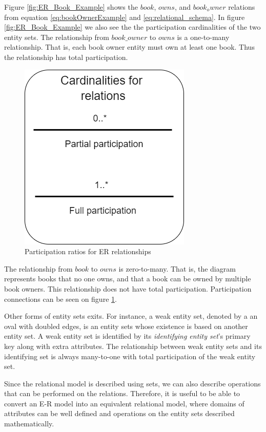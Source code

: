 Figure \ref{fig:ER_Book_Example} shows the $book$, $owns$, and $book_owner$ relations from equation \ref{eq:bookOwnerExample} and \ref{eq:relational_schema}.
In figure \ref{fig:ER_Book_Example} we also see the  the participation cardinalities of the two entity sets. 
The relationship from $book\_owner$ to $owns$ is a one-to-many relationship. That is, each book owner entity must own at least one book. Thus the relationship has total participation. 
\begin{figure}[h]
    \centering
    \includegraphics[scale=0.5]{Images/cardinalities.png}
    \caption{Participation ratios for ER relationships}
    \label{fig:ERDiagram_Cardinality}
\end{figure}
The relationship from $book$ to $owns$ is zero-to-many. That is, the diagram represents books that no one owns, and that a book can be owned by multiple book owners.
This relationship does not have total participation. Participation connections can be seen on figure \ref{fig:ERDiagram_Cardinality}.


Other forms of entity sets exits. For instance, a weak entity set, denoted by a an oval with doubled edges, is an entity sets whose existence is based on another entity set.
A weak entity set is identified by its \textit{identifying entity set}'s primary key along with extra attributes. 
The relationship between weak entity sets and its identifying set is always many-to-one with total  participation of the weak entity set.

Since the relational model is described using sets, we can also describe operations that can be performed on the relations.
Therefore, it is useful to be able to convert an E-R model into an equivalent relational model, where domains of attributes can be well defined and operations on the entity sets described mathematically.

